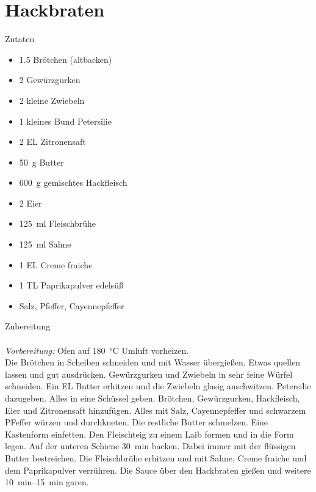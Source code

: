 \section*{Hackbraten}
\ihead{}\ohead{}
\cfoot{}
{\Large Zutaten}
\begin{multicols}{2}
\begin{itemize}
    \item \num{1.5} Brötchen (altbacken)
    \item \num{2} Gewürzgurken
    \item \num{2} kleine Zwiebeln
    \item \num{1} kleines Bund Petersilie
    \item \num{2} EL Zitronensaft
    \item \SI{50}{g} Butter
    \item \SI{600}{g} gemischtes Hackfleisch
    \item \num{2} Eier
    \item \SI{125}{ml} Fleischbrühe
    \item \SI{125}{ml} Sahne
    \item \num{1} EL Creme fraiche
    \item \num{1} TL Paprikapulver edelsüß
    \item Salz, Pfeffer, Cayennepfeffer
\end{itemize}
\end{multicols}
\noindent
{\Large Zubereitung}\\
\\
\textit{Vorbereitung:} Ofen auf \SI{180}{\celsius} Umluft vorheizen.\\
Die Brötchen in Scheiben schneiden und mit Wasser übergießen.
Etwas quellen lassen und gut ausdrücken. 
Gewürzgurken und Zwiebeln in sehr feine Würfel schneiden.
Ein EL Butter erhitzen und die Zwiebeln glasig anschwitzen. 
Petersilie dazugeben. 
Alles in eine Schüssel geben. 
Brötchen, Gewürzgurken, Hackfleisch, Eier und Zitronensaft hinzufügen. 
Alles mit Salz, Cayennepfeffer und schwarzem PFeffer würzen und durchkneten. 
Die restliche Butter schmelzen. 
Eine Kastenform einfetten.
Den Fleischteig zu einem Laib formen und in die Form legen. 
Auf der unteren Schiene \SI{30}{min} backen. 
Dabei immer mit der flüssigen Butter bestreichen. 
Die Fleischbrühe erhitzen und mit Sahne, Creme fraiche und dem Paprikapulver verrühren. 
Die Sauce über den Hackbraten gießen und weitere \SIrange{10}{15}{min} garen. 
